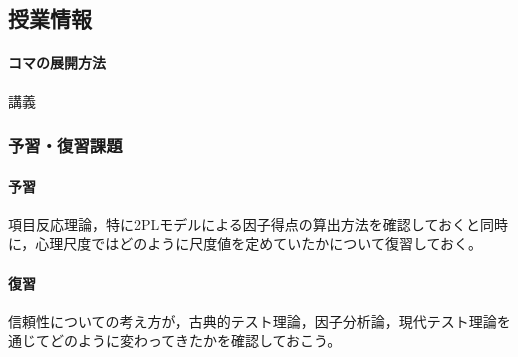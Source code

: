 \subsection{授業情報}
\paragraph{コマの展開方法}
講義
\subsubsection{予習・復習課題}
\paragraph{予習}項目反応理論，特に2PLモデルによる因子得点の算出方法を確認しておくと同時に，心理尺度ではどのように尺度値を定めていたかについて復習しておく。
\paragraph{復習}信頼性についての考え方が，古典的テスト理論，因子分析論，現代テスト理論を通じてどのように変わってきたかを確認しておこう。
